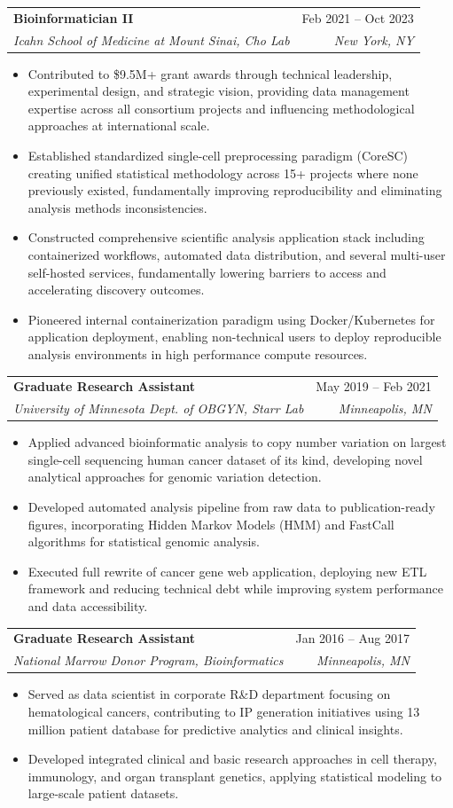 \documentclass[letterpaper,10]{article}
\makeatletter
\newcommand{\resumeItem}[1]{
  \item\small{
    {#1 \vspace{-2pt}}
  }
}
\newcommand{\resumeSubheading}[4]{
  \vspace{-2pt}\item
    \begin{tabular*}{0.97\textwidth}[t]{l@{\extracolsep{\fill}}r}
      \textbf{#1} & #2 \\
      \textit{\small#3} & \textit{\small #4} \\
    \end{tabular*}\vspace{-7pt}
}
\newcommand{\resumeItemListStart}{\begin{itemize}}
\newcommand{\resumeItemListEnd}{\end{itemize}\vspace{-5pt}}
\makeatother
\begin{document}
    \resumeSubheading
      {Bioinformatician II}{Feb 2021 -- Oct 2023}
      {Icahn School of Medicine at Mount Sinai, Cho Lab}{New York, NY}
      \resumeItemListStart
        \resumeItem{Contributed to \$9.5M+ grant awards through technical leadership, experimental design, and strategic vision, providing data management expertise across all consortium projects and influencing methodological approaches at international scale.}
        \resumeItem{Established standardized single-cell preprocessing paradigm (CoreSC) creating unified statistical methodology across 15+ projects where none previously existed, fundamentally improving reproducibility and eliminating analysis methods inconsistencies.}
        \resumeItem{Constructed comprehensive scientific analysis application stack including containerized workflows, automated data distribution, and several multi-user self-hosted services, fundamentally lowering barriers to access and accelerating discovery outcomes.}
        \resumeItem{Pioneered internal containerization paradigm using Docker/Kubernetes for application deployment, enabling non-technical users to deploy reproducible analysis environments in high performance compute resources.}
      \resumeItemListEnd

    \resumeSubheading
      {Graduate Research Assistant}{May 2019 -- Feb 2021}
      {University of Minnesota Dept. of OBGYN, Starr Lab}{Minneapolis, MN}
      \resumeItemListStart
        \resumeItem{Applied advanced bioinformatic analysis to copy number variation on largest single-cell sequencing human cancer dataset of its kind, developing novel analytical approaches for genomic variation detection.}
        \resumeItem{Developed automated analysis pipeline from raw data to publication-ready figures, incorporating Hidden Markov Models (HMM) and FastCall algorithms for statistical genomic analysis.}
        \resumeItem{Executed full rewrite of cancer gene web application, deploying new ETL framework and reducing technical debt while improving system performance and data accessibility.}
      \resumeItemListEnd

    \resumeSubheading
      {Graduate Research Assistant}{Jan 2016 -- Aug 2017}
      {National Marrow Donor Program, Bioinformatics}{Minneapolis, MN}
      \resumeItemListStart
        \resumeItem{Served as data scientist in corporate R\&D department focusing on hematological cancers, contributing to IP generation initiatives using 13 million patient database for predictive analytics and clinical insights.}
        \resumeItem{Developed integrated clinical and basic research approaches in cell therapy, immunology, and organ transplant genetics, applying statistical modeling to large-scale patient datasets.}
      \resumeItemListEnd
\end{document}
